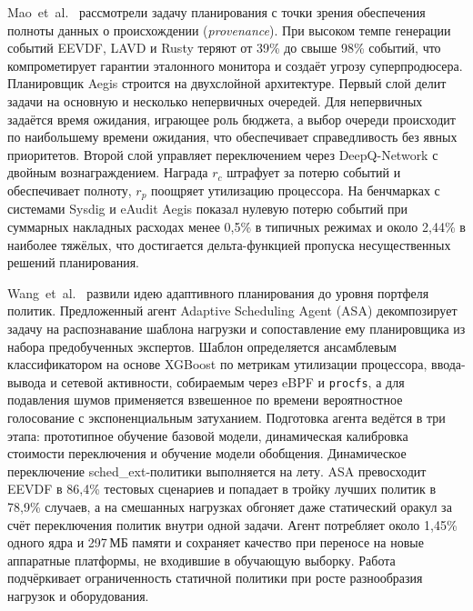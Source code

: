 \documentclass[14pt, oneside]{extbook}
\begin{document}
        Mao~et~al.~\cite{aegis} рассмотрели задачу планирования
        с точки зрения обеспечения полноты данных о происхождении
        (\emph{provenance}). При высоком темпе генерации событий
        EEVDF, LAVD и Rusty теряют от 39\% до свыше 98\% событий,
        что компрометирует гарантии эталонного монитора и создаёт
        угрозу суперпродюсера. Планировщик Aegis строится на
        двухслойной архитектуре. Первый слой делит задачи на
        основную и несколько непервичных очередей. Для непервичных
        задаётся время ожидания, играющее роль бюджета, а выбор
        очереди происходит по наибольшему времени ожидания, что
        обеспечивает справедливость без явных приоритетов. Второй
        слой управляет переключением через DeepQ-Network с двойным
        вознаграждением. Награда $r_c$ штрафует за потерю событий
        и обеспечивает полноту, $r_p$ поощряет утилизацию
        процессора. На бенчмарках с системами Sysdig и eAudit Aegis
        показал нулевую потерю событий при суммарных накладных
        расходах менее 0,5\% в типичных режимах и около 2,44\%
        в наиболее тяжёлых, что достигается дельта-функцией пропуска
        несущественных решений планирования.

        Wang~et~al.~\cite{mos} развили идею адаптивного
        планирования до уровня портфеля политик. Предложенный агент
        Adaptive Scheduling Agent (ASA) декомпозирует задачу
        на распознавание шаблона нагрузки и сопоставление ему
        планировщика из набора предобученных экспертов. Шаблон
        определяется ансамблевым классификатором на основе XGBoost
        по метрикам утилизации процессора, ввода-вывода и сетевой
        активности, собираемым через eBPF и \texttt{procfs}, а для
        подавления шумов применяется взвешенное по времени
        вероятностное голосование с экспоненциальным затуханием.
        Подготовка агента ведётся в три этапа: прототипное обучение
        базовой модели, динамическая калибровка стоимости
        переключения и обучение модели обобщения. Динамическое
        переключение sched\_ext-политики выполняется на лету.
        ASA превосходит EEVDF в 86,4\% тестовых сценариев и попадает
        в тройку лучших политик в 78,9\% случаев, а на смешанных
        нагрузках обгоняет даже статический оракул за счёт
        переключения политик внутри одной задачи. Агент потребляет
        около 1,45\% одного ядра и 297\,МБ памяти и сохраняет
        качество при переносе на новые аппаратные платформы,
        не входившие в обучающую выборку. Работа подчёркивает
        ограниченность статичной
        политики при росте разнообразия нагрузок и оборудования.
\end{document}
